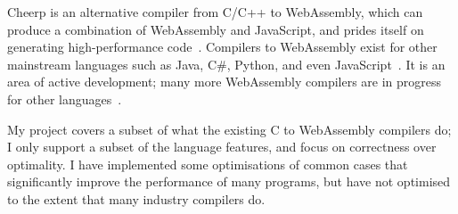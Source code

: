 \documentclass[00-main.tex]{subfiles}
\begin{document}
Cheerp is an alternative compiler from C/C++ to WebAssembly, which can produce a combination of WebAssembly and JavaScript, and prides itself on generating high-performance code~.
Compilers to WebAssembly exist for other mainstream languages such as Java, C\#, Python, and even JavaScript~.
It is an area of active development; many more WebAssembly compilers are in progress for other languages~.

My project covers a subset of what the existing C to WebAssembly compilers do; I only support a subset of the language features, and focus on correctness over optimality.
I have implemented some optimisations of common cases that significantly improve the performance of many programs, but have not optimised to the extent that many industry compilers do.
\end{document}
